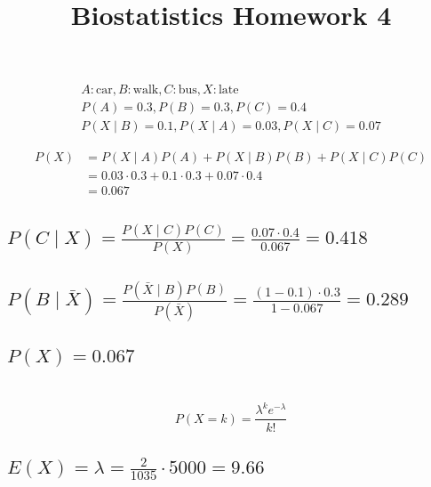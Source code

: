 \documentclass{homework}
\begin{document}
\title{Biostatistics Homework 4}
\author{\chineseName \masterStudentID}
\date{}
\maketitle

\section{}

\begin{gather*}
A: \text{car}, B: \text{walk}, C: \text{bus}, X:\text{late} \\
P(A)=0.3, P(B)=0.3, P(C)=0.4 \\ 
P(X\mid B)=0.1, P(X\mid A)=0.03, P(X\mid C)=0.07
\end{gather*}

\begin{align*}
P(X) &= P(X\mid A)P(A) + P(X\mid B)P(B) + P(X\mid C)P(C) \\
&= 0.03 \cdot 0.3 + 0.1 \cdot 0.3 + 0.07 \cdot 0.4 \\
&= 0.067
\end{align*}

\subsection{$P(C\mid X) = \frac{P(X\mid C)P(C)}{P(X)} = \frac{0.07 \cdot 0.4}{0.067} = 0.418$}

\subsection{$P(B\mid\bar X) = \frac{P(\bar X\mid B)P(B)}{P(\bar X)} = \frac{(1 - 0.1) \cdot 0.3}{1 - 0.067} = 0.289$}

\subsection{$P(X) = 0.067$}

\section{}

\[
P(X=k) = \frac{\lambda^k e^{-\lambda}}{k!}
\]

\subsection{$E(X) = \lambda = \frac{2}{1035} \cdot 5000 = 9.66$}
\end{document}
